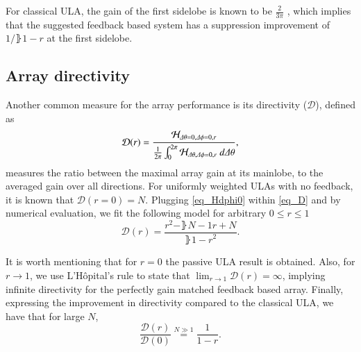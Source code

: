 \ifdefined\showDev
\else
\fi
\par For classical ULA, the gain of the first sidelobe is known to be $\frac{2}{3\pi}$ \cite{van2004optimum}, which implies that the suggested feedback based system has a suppression improvement of $1/\rBrace{1-r}$ at the first sidelobe.

\subsection*{Array directivity}
Another common measure for the array performance is its directivity \cite{van2004optimum} ($\mathcal{D}$), defined as
\begin{equation}\label{eq_D}
    \mathcal{D}(r) = \frac{\Hr_{\dTheta=0,\dPhi=0,r}}{\frac{1}{2\pi}\int_{0}^{2\pi}\Hr_{\dTheta,\dPhi=0,r}\ d\dTheta},
\end{equation}
measures the ratio between the maximal array gain at its mainlobe, to the averaged gain over all directions. 
For uniformly weighted ULAs with no feedback, it is known \cite{van2004optimum} that $\mathcal{D}(r=0) = N$.
Plugging \eqref{eq_Hdphi0} within \eqref{eq_D} and by numerical evaluation, we fit the following model for arbitrary $0\leq r\leq 1$
\begin{equation}\label{eq_D}
    \mathcal{D}(r) = \frac{r^{2}-\rBrace{N-1}r+N}{\rBrace{1-r}^{2}}.
\end{equation}
\par It is worth mentioning that for $r=0$ the passive ULA result is obtained. Also, for $r\to1$, we use L'Hôpital's rule to state that $\lim_{r\rightarrow 1}\mathcal{D}(r)=\infty$, implying infinite directivity for the perfectly gain matched feedback based array. Finally, expressing the improvement in directivity compared to the classical ULA, we have that for large $N$,
\begin{equation}\label{eq_Dimprovement}
\frac{\mathcal{D}(r)}{\mathcal{D}(0)}\overset{N\gg1}{=}\frac{1}{1-r}.
\end{equation}
